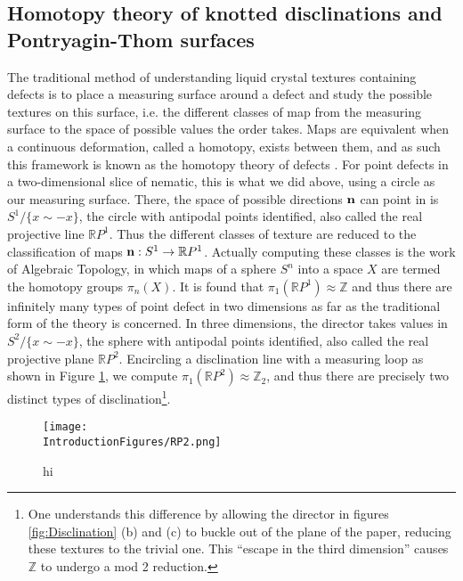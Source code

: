 \subsection{Homotopy theory of knotted disclinations and Pontryagin-Thom surfaces}
The traditional method of understanding liquid crystal textures containing defects is to place a measuring surface around a defect and study the possible textures on this surface, i.e. the different classes of map from the measuring surface to the space of possible values the order takes. Maps are equivalent when a continuous deformation, called a homotopy, exists between them, and as such this framework is known as the homotopy theory of defects \cite{Mermin,Alexander}. For point defects in a two-dimensional slice of nematic, this is what we did above, using a circle as our measuring surface. There, the space of possible directions $\bf n$ can point in is $S^1/\{x\sim-x\}$, the circle with antipodal points identified, also called the real projective line $\mathbb{R}P^1$. Thus the different classes of texture are reduced to the classification of maps ${\bf n}:S^1 \rightarrow \mathbb{R}P^1$. Actually computing these classes is the work of Algebraic Topology, in which maps of a sphere $S^n$ into a space $X$ are termed the homotopy groups $\pi_n(X)$. It is found that $\pi_1(\mathbb{R}P^1) \approx \mathbb{Z}$ and thus there are infinitely many types of point defect in two dimensions as far as the traditional form of the theory is concerned. In three dimensions, the director takes values in $S^2/\{x\sim-x\}$, the sphere with antipodal points identified, also called the real projective plane $\mathbb{R}P^2$. Encircling a disclination line with a measuring loop as shown in Figure \ref{fig:RP2}, we compute $\pi_1(\mathbb{R}P^2) \approx \mathbb{Z}_2$, and thus there are precisely two distinct types of disclination\footnote{ One understands this difference by allowing the director in figures \ref{fig:Disclination} (b) and (c) to buckle out of the plane of the paper, reducing these textures to the trivial one. This ``escape in the third dimension'' causes $\mathbb{Z}$ to undergo a mod 2 reduction.}.
\begin{figure}[htbp]
\centering
\texttt{[image: \\IntroductionFigures/RP2.png]}
\caption{hi }
\label{fig:RP2}
\end{figure}

